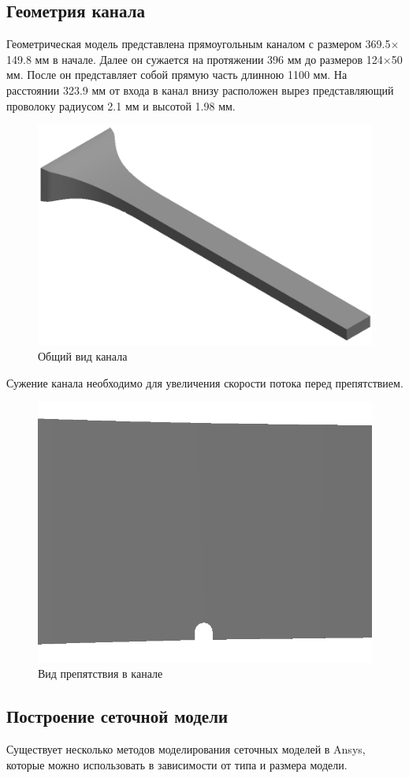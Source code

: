\subsection{Геометрия канала}
	Геометрическая модель представлена прямоугольным каналом с размером 369.5$\times$149.8 мм в начале. Далее он сужается на протяжении 396 мм до размеров 124$\times$50 мм. После он представляет собой прямую часть длинною 1100 мм. На расстоянии 323.9 мм от входа в канал внизу расположен вырез представляющий проволоку радиусом 2.1 мм и высотой 1.98 мм.
	\begin{figure}[H]
		\centering
		\includegraphics[width=0.7\linewidth]{../Assets/ВидКанала1}
		\caption{Общий вид канала}
		\label{fig:channelview}
	\end{figure}
	Сужение канала необходимо для увеличения скорости потока перед препятствием.
	\begin{figure}[H]
		\centering
		\includegraphics[width=0.6\linewidth]{../Assets/ВидКанала4}
		\caption{Вид препятствия в канале}
		\label{fig:vortexgeneratorview}
	\end{figure}

\subsection{Построение сеточной модели}
	Существует несколько методов моделирования сеточных моделей в Ansys, которые можно использовать в зависимости от типа и размера модели.
	
